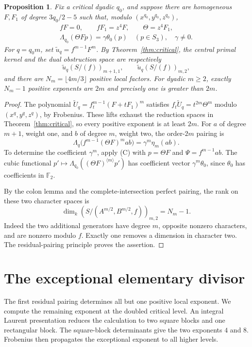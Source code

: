 \documentclass[11pt,a4paper,reqno]{amsart}
\numberwithin{equation}{section}
\theoremstyle{plain}
\newtheorem{proposition}[theorem]{Proposition}
\theoremstyle{definition}
\theoremstyle{remark}
\begin{document}
\begin{proposition}
Fix a critical dyadic $q_0$, and suppose there are homogeneous $F,F_1$ of degree
$3q_0/2-5$ such that, modulo $(x^{q_0},y^{q_0},z^{q_0})$,
\[
\begin{gathered}
fF=0,\qquad fF_1=z^4F,\qquad \Theta=z^4F_1,\\
\Lambda_{q_0}(\Theta Fp)=\gamma\theta_0(p)\quad(p\in S_3),\quad\gamma\ne0.
\end{gathered}
\]
For $q=q_0m$, set $\widetilde u_q=f^{m-1}F^m$. By Theorem~\ref{thm:critical}, the
central primal kernel and the dual obstruction space are respectively
\[
\widetilde u_q(S/(f))_{m+1,1},\qquad
\widetilde u_q(S/(f))_{m,2},
\]
and there are $N_m=\lfloor4m/3\rfloor$ positive local factors. For dyadic $m\geq2$,
exactly $N_m-1$ positive exponents are $2m$ and precisely one is greater than $2m$.
\end{proposition}
\begin{proof}
The polynomial $\widetilde U_q=f_t^{m-1}(F+tF_1)^m$ satisfies
$f_t\widetilde U_q=t^{2m}\Theta^m$ modulo $(x^q,y^q,z^q)$, by Frobenius. These lifts
exhaust the reduction spaces in Theorem~\ref{thm:critical}, so every positive
exponent is at least $2m$. For $a$ of degree $m+1$, weight one, and $b$ of degree
$m$, weight two, the order-$2m$ pairing is
\[
\Lambda_q\bigl(f^{m-1}(\Theta F)^mab\bigr)=\gamma^m\eta_m(ab).
\]
To determine the coefficient $\gamma^m$, apply (C) with $p=\Theta F$ and
$\Psi=f^{m-1}ab$. The cubic functional $p'\mapsto\Lambda_{q_0}((\Theta F)^{\langle
m\rangle}p')$ has coefficient vector $\gamma^m\theta_0$, since $\theta_0$ has
coefficients in $\mathbb F_2$.

By the colon lemma and the complete-intersection perfect pairing, the rank on these
two character spaces is
\[
\dim_k(S/(A^{m/2},B^{m/2},f))_{m,2}=N_m-1.
\]
Indeed the two additional generators have degree $m$, opposite nonzero characters,
and are nonzero modulo $f$. Exactly one removes a dimension in character two. The
residual-pairing principle proves the assertion.
\end{proof}
\section{The exceptional elementary divisor}\label{sec:exceptional}
The first residual pairing determines all but one positive local
exponent. We compute the remaining exponent at the doubled critical
level. An integral Laurent presentation reduces the calculation to
two square blocks and one rectangular block. The square-block
determinants give the two exponents $4$ and $8$. Frobenius then
propagates the exceptional exponent to all higher levels.
\end{document}
